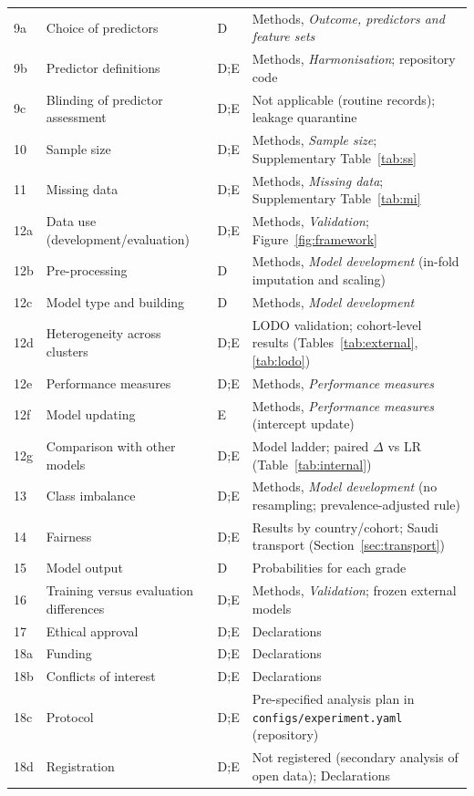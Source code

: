 \begin{longtable}{p{0.6cm}p{3.0cm}p{0.8cm}p{7.5cm}}
9a & Choice of predictors & D & Methods, \emph{Outcome, predictors and feature sets} \\
9b & Predictor definitions & D;E & Methods, \emph{Harmonisation}; repository code \\
9c & Blinding of predictor assessment & D;E & Not applicable (routine records); leakage quarantine \\
10 & Sample size & D;E & Methods, \emph{Sample size}; Supplementary Table~\ref{tab:ss} \\
11 & Missing data & D;E & Methods, \emph{Missing data}; Supplementary Table~\ref{tab:mi} \\
12a & Data use (development/evaluation) & D;E & Methods, \emph{Validation}; Figure~\ref{fig:framework} \\
12b & Pre-processing & D & Methods, \emph{Model development} (in-fold imputation and scaling) \\
12c & Model type and building & D & Methods, \emph{Model development} \\
12d & Heterogeneity across clusters & D;E & LODO validation; cohort-level results (Tables~\ref{tab:external}, \ref{tab:lodo}) \\
12e & Performance measures & D;E & Methods, \emph{Performance measures} \\
12f & Model updating & E & Methods, \emph{Performance measures} (intercept update) \\
12g & Comparison with other models & D;E & Model ladder; paired $\Delta$ vs LR (Table~\ref{tab:internal}) \\
13 & Class imbalance & D;E & Methods, \emph{Model development} (no resampling; prevalence-adjusted rule) \\
14 & Fairness & D;E & Results by country/cohort; Saudi transport (Section~\ref{sec:transport}) \\
15 & Model output & D & Probabilities for each grade \\
16 & Training versus evaluation differences & D;E & Methods, \emph{Validation}; frozen external models \\
17 & Ethical approval & D;E & Declarations \\
18a & Funding & D;E & Declarations \\
18b & Conflicts of interest & D;E & Declarations \\
18c & Protocol & D;E & Pre-specified analysis plan in \texttt{configs/experiment.yaml} (repository) \\
18d & Registration & D;E & Not registered (secondary analysis of open data); Declarations \\

\end{longtable}
